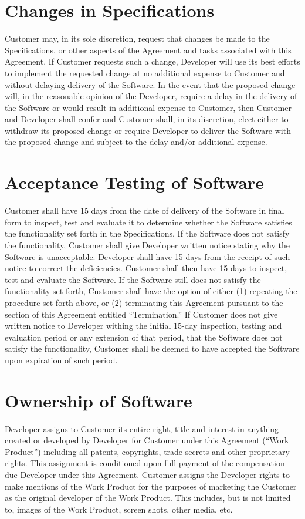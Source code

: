 \documentclass{article}
\begin{document}
\section{Changes in Specifications}
Customer may, in its sole discretion, request that changes be made to the Specifications, or other aspects of the Agreement and tasks associated with this Agreement. If Customer requests such a change, Developer will use its best efforts to implement the requested change at no additional expense to Customer and without delaying delivery of the Software. In the event that the proposed change will, in the reasonable opinion of the Developer, require a delay in the delivery of the Software or would result in additional expense to Customer, then Customer and Developer shall confer and Customer shall, in its discretion, elect either to withdraw its proposed change or require Developer to deliver the Software with the proposed change and subject to the delay and/or additional expense.
\section{Acceptance Testing of Software}
Customer shall have 15 days from the date of delivery of the Software in final form to inspect, test and evaluate it to determine whether the Software satisfies the functionality set forth in the Specifications.
If the Software does not satisfy the functionality, Customer shall give Developer written notice stating why the Software is unacceptable. Developer shall have 15 days from the receipt of such notice to correct the deficiencies. Customer shall then have 15 days to inspect, test and evaluate the Software. If the Software still does not satisfy the functionality set forth, Customer shall have the option of either (1) repeating the procedure set forth above, or (2) terminating this Agreement pursuant to the section of this Agreement entitled “Termination.” If Customer does not give written notice to Developer withing the initial 15-day inspection, testing and evaluation period or any extension of that period, that the Software does not satisfy the functionality, Customer shall be deemed to have accepted the Software upon expiration of such period.
\section{Ownership of Software}
Developer assigns to Customer its entire right, title and interest in anything created or developed by Developer for Customer under this Agreement (“Work Product”) including all patents, copyrights, trade secrets and other proprietary rights. This assignment is conditioned upon full payment of the compensation due Developer under this Agreement.
Customer assigns the Developer rights to make mentions of the Work Product for the purposes of marketing the Customer as the original developer of the Work Product. This includes, but is not limited to, images of the Work Product, screen shots, other media, etc.
\end{document}
